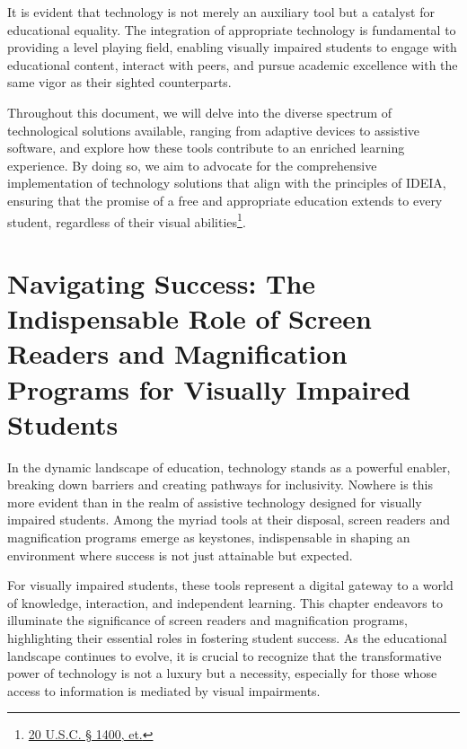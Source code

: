 \documentclass[12pt,letterpaper,twoside]{extreport}
\begin{document}
It is evident that technology is not merely an auxiliary tool but a catalyst for educational equality. The integration of appropriate technology is fundamental to providing a level playing field, enabling visually impaired students to engage with educational content, interact with peers, and pursue academic excellence with the same vigor as their sighted counterparts.

Throughout this document, we will delve into the diverse spectrum of technological solutions available, ranging from adaptive devices to assistive software, and explore how these tools contribute to an enriched learning experience. By doing so, we aim to advocate for the comprehensive implementation of technology solutions that align with the principles of IDEIA, ensuring that the promise of a free and appropriate education extends to every student, regardless of their visual abilities\footnote{\href{https://sites.ed.gov/idea/statuteregulations/}{20 U.S.C. § 1400, et.}}.

\pagebreak
\fancyhead[RO]{\lastxmark}
\fancyhead[LE]{\firstxmark}
\fancyfoot[C]{}

\hypertarget{vision-assistive-technology-laptop-computer-requirements}{}\chapter[\raggedright Navigating Success:  \\ The Indispensable Role of Screen Readers and Magnification Programs for Visually Impaired Students]{Navigating Success: The Indispensable Role of Screen Readers and Magnification Programs for Visually Impaired Students}\label{vision-assistive-technology-laptop-computer-requirements}
\minitoc

In the dynamic landscape of education, technology stands as a powerful enabler, breaking down barriers and creating pathways for inclusivity. Nowhere is this more evident than in the realm of assistive technology designed for visually impaired students. Among the myriad tools at their disposal, screen readers and magnification programs emerge as keystones, indispensable in shaping an environment where success is not just attainable but expected.

For visually impaired students, these tools represent a digital gateway to a world of knowledge, interaction, and independent learning. This chapter endeavors to illuminate the significance of screen readers and magnification programs, highlighting their essential roles in fostering student success. As the educational landscape continues to evolve, it is crucial to recognize that the transformative power of technology is not a luxury but a necessity, especially for those whose access to information is mediated by visual impairments.
\end{document}
